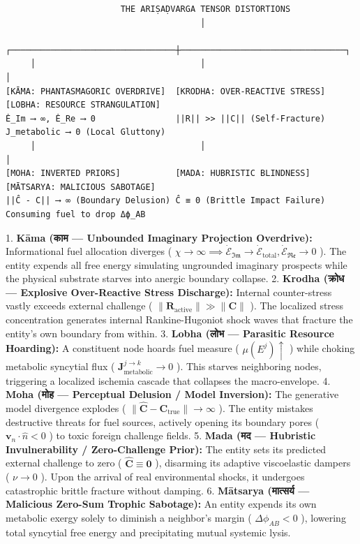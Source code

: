 \documentclass[11pt,a4paper]{article}
\theoremstyle{definition}
\theoremstyle{remark}
\begin{document}
\begin{verbatim}
                       THE ARIṢAḌVARGA TENSOR DISTORTIONS
                                       │
     ┌─────────────────────────────────┼─────────────────────────────────┐
     │                                 │                                 │
[KĀMA: PHANTASMAGORIC OVERDRIVE]  [KRODHA: OVER-REACTIVE STRESS]    [LOBHA: RESOURCE STRANGULATION]
Ė_Im ⟶ ∞, Ė_Re ⟶ 0                ||R|| >> ||C|| (Self-Fracture)   J_metabolic ⟶ 0 (Local Gluttony)
     │                                 │                                 │
[MOHA: INVERTED PRIORS]           [MADA: HUBRISTIC BLINDNESS]       [MĀTSARYA: MALICIOUS SABOTAGE]
||Ĉ - C|| ⟶ ∞ (Boundary Delusion) Ĉ ≡ 0 (Brittle Impact Failure)   Consuming fuel to drop Δϕ_AB
\end{verbatim}

1. \textbf{Kāma (काम — Unbounded Imaginary Projection Overdrive):}
Informational fuel allocation diverges ( $\chi \to \infty \implies \dot{\mathcal{E}}_{\mathfrak{Im}} \to \dot{\mathcal{E}}_{\text{total}}, \dot{\mathcal{E}}_{\mathfrak{Re}} \to 0$ ). The entity expends all free energy simulating ungrounded imaginary prospects while the physical substrate starves into anergic boundary collapse.
2. \textbf{Krodha (क्रोध — Explosive Over-Reactive Stress Discharge):}
Internal counter-stress vastly exceeds external challenge ( $\|\mathbf{R}_{\text{active}}\| \gg \|\mathbf{C}\|$ ). The localized stress concentration generates internal Rankine-Hugoniot shock waves that fracture the entity's own boundary from within.
3. \textbf{Lobha (लोभ — Parasitic Resource Hoarding):}
A constituent node hoards fuel measure ( $\mu(E^j) \uparrow$ ) while choking metabolic syncytial flux ( $\mathbf{J}_{\text{metabolic}}^{j \to k} \to 0$ ). This starves neighboring nodes, triggering a localized ischemia cascade that collapses the macro-envelope.
4. \textbf{Moha (मोह — Perceptual Delusion / Model Inversion):}
The generative model divergence explodes ( $\|\hat{\mathbf{C}} - \mathbf{C}_{\text{true}}\| \to \infty$ ). The entity mistakes destructive threats for fuel sources, actively opening its boundary pores ( $\mathbf{v}_n \cdot \hat{n} < 0$ ) to toxic foreign challenge fields.
5. \textbf{Mada (मद — Hubristic Invulnerability / Zero-Challenge Prior):}
The entity sets its predicted external challenge to zero ( $\hat{\mathbf{C}} \equiv \mathbf{0}$ ), disarming its adaptive viscoelastic dampers ( $\nu \to 0$ ). Upon the arrival of real environmental shocks, it undergoes catastrophic brittle fracture without damping.
6. \textbf{Mātsarya (मात्सर्य — Malicious Zero-Sum Trophic Sabotage):}
An entity expends its own metabolic exergy solely to diminish a neighbor's margin ( $\Delta \phi_{AB} < 0$ ), lowering total syncytial free energy and precipitating mutual systemic lysis.
\end{document}

